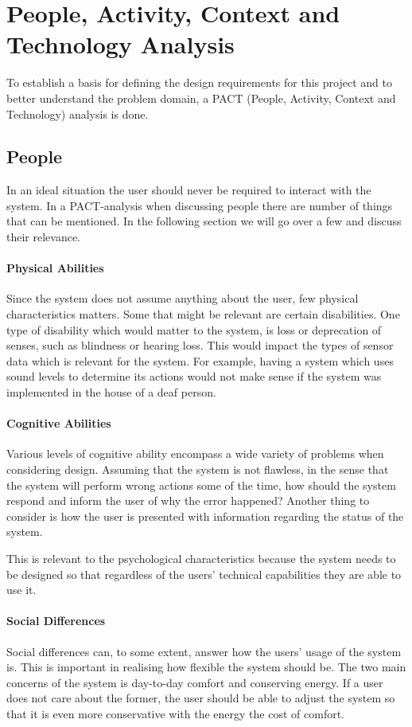 \section{People, Activity, Context and Technology Analysis}
To establish a basis for defining the design requirements for this project and
to better understand the problem domain, a PACT (People, Activity, Context and Technology) analysis is done.

\subsection{People}
In an ideal situation the user should never be required to interact with the system. In a PACT-analysis when discussing people there are number of things that can be mentioned. In the following section we will go over a few and discuss their relevance.

\paragraph{Physical Abilities}
Since the system does not assume anything about the user, few physical characteristics matters. Some that might be relevant are certain disabilities. One type of disability which would matter to the system, is loss or deprecation of senses, such as blindness or hearing loss. This would impact the types of sensor data which is relevant for the system. For example, having a system which uses sound levels to determine its actions would not make sense if the system was implemented in the house of a deaf person.

\paragraph{Cognitive Abilities}
Various levels of cognitive ability encompass a wide variety of problems
when considering design. Assuming that the system is not flawless, in the
  sense that the system will perform wrong actions some of the time, how should
the system respond and inform the user of why the error happened? Another thing
to consider is how the user is presented with information regarding the status
of the system.

This is relevant to the psychological characteristics because the system needs to be designed so that regardless of the users' technical capabilities they are able to use it.

\paragraph{Social Differences}
Social differences can, to some extent, answer how the users' usage of
the system is. This is important in realising how flexible the system should be.
The two main concerns of the system is day-to-day comfort and conserving energy.
If a user does not care about the former, the user should be able to adjust the system so that it is even more conservative with the energy the cost of comfort.

